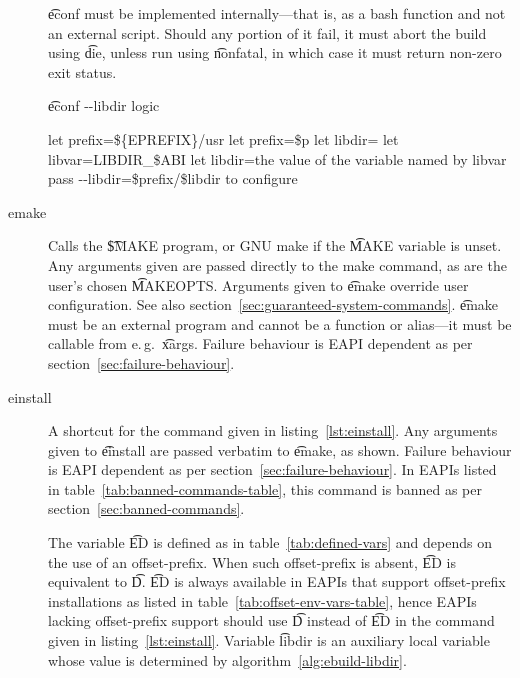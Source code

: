 \begin{description}
    \t{econf} must be implemented internally---that is, as a bash function and not an external
    script. Should any portion of it fail, it must abort the build using \t{die}, unless run using
    \t{nonfatal}, in which case it must return non-zero exit status.

\begin{algorithm}
\caption{\t{econf -{}-libdir} logic} \label{alg:econf-libdir}
\begin{algorithmic}[1]
\STATE let prefix=\$\{EPREFIX\}/usr
    \STATE let prefix=\$p
\ENDIF
\STATE let libdir=
    \STATE let libvar=LIBDIR_\$ABI
        \STATE let libdir=the value of the variable named by libvar
    \ENDIF
\ENDIF
{}
    \STATE pass -{}-libdir=\$prefix/\$libdir to configure
\ENDIF
\end{algorithmic}
\end{algorithm}

\item[emake] Calls the \t{\$MAKE} program, or GNU make if the \t{MAKE} variable is unset.
    Any arguments given are passed directly to the make command, as are the user's chosen
    \t{MAKEOPTS}\@. Arguments given to \t{emake} override user configuration. See also
    section~\ref{sec:guaranteed-system-commands}. \t{emake} must be an external program and cannot
    be a function or alias---it must be callable from e.\,g.\ \t{xargs}. Failure behaviour is EAPI
    dependent as per section~\ref{sec:failure-behaviour}.

\item[einstall] A shortcut for the command given in listing~\ref{lst:einstall}. Any arguments given
    to \t{einstall} are passed verbatim to \t{emake}, as shown. Failure behaviour is EAPI dependent
    as per section~\ref{sec:failure-behaviour}.
    In EAPIs listed in table~\ref{tab:banned-commands-table}, this command is banned as per
    section~\ref{sec:banned-commands}.

    The variable \t{ED} is defined as in table~\ref{tab:defined-vars} and depends on the use of an
    offset-prefix. When such offset-prefix is absent, \t{ED} is equivalent to \t{D}\@. \t{ED} is
    always available in EAPIs that support offset-prefix installations as listed in
    table~\ref{tab:offset-env-vars-table}, hence EAPIs lacking offset-prefix support should use
    \t{D} instead of \t{ED} in the command given in listing~\ref{lst:einstall}.
    Variable \t{libdir} is an auxiliary local variable whose value is determined by
    algorithm~\ref{alg:ebuild-libdir}.


\end{description}
